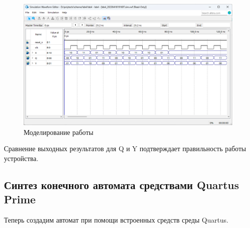 \documentclass[a4paper,12pt]{article}
\begin{document}
    \begin{figure}[H]
        \centering
        \includegraphics[width=\linewidth]{polytech/scheme/report-lab4/subfiles/images/wave}
        \caption{Моделирование работы}
        \label{fig:wave}
    \end{figure}

    Сравнение выходных результатов для Q и Y подтверждает правильность работы устройства.

    \subsection{Синтез конечного автомата средствами Quartus Prime}

    Теперь создадим автомат при помощи встроенных средств среды Quartus.
\end{document}
